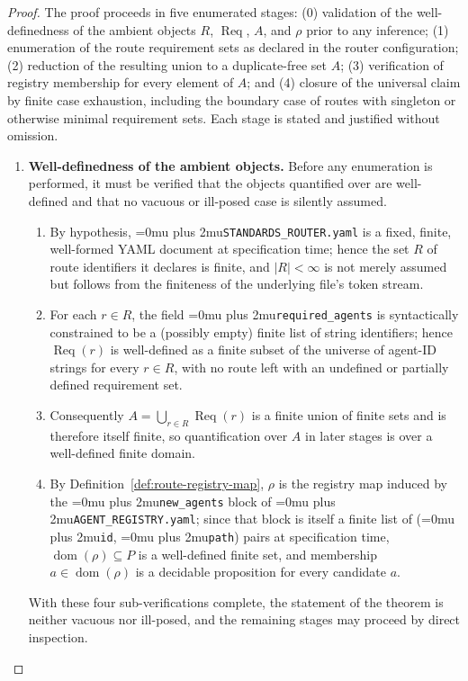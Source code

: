 \documentclass[12pt]{article}
\theoremstyle{definition}
\DeclareRobustCommand{\code}[1]{\begingroup\Urlmuskip=0mu plus 2mu\relax\nolinkurl{#1}\endgroup}
\begin{document}
\begin{proof}
The proof proceeds in five enumerated stages: (0) validation of the
well-definedness of the ambient objects $R$, $\operatorname{Req}$,
$A$, and $\rho$ prior to any inference; (1) enumeration of the route
requirement sets as declared in the router configuration; (2)
reduction of the resulting union to a duplicate-free set $A$; (3)
verification of registry membership for every element of $A$; and
(4) closure of the universal claim by finite case exhaustion,
including the boundary case of routes with singleton or otherwise
minimal requirement sets. Each stage is stated and justified without
omission.

\begin{enumerate}
      \item \textbf{Well-definedness of the ambient objects.} Before
      any enumeration is performed, it must be verified that the
      objects quantified over are well-defined and that no vacuous
      or ill-posed case is silently assumed.
      \begin{enumerate}
            \item[(a)] By hypothesis, \code{STANDARDS\_ROUTER.yaml}
            is a fixed, finite, well-formed YAML document at
            specification time; hence the set $R$ of route
            identifiers it declares is finite, and
            $|R| < \infty$ is not merely assumed but follows from
            the finiteness of the underlying file's token stream.
            \item[(b)] For each $r \in R$, the field
            \code{required\_agents} is syntactically constrained to
            be a (possibly empty) finite list of string identifiers;
            hence $\operatorname{Req}(r)$ is well-defined as a
            finite subset of the universe of agent-ID strings for
            every $r \in R$, with no route left with an undefined or
            partially defined requirement set.
            \item[(c)] Consequently
            $A = \bigcup_{r \in R} \operatorname{Req}(r)$ is a
            finite union of finite sets and is therefore itself
            finite, so quantification over $A$ in later stages is
            over a well-defined finite domain.
            \item[(d)] By Definition~\ref{def:route-registry-map},
            $\rho$ is the registry map induced by the
            \code{new\_agents} block of \code{AGENT\_REGISTRY.yaml};
            since that block is itself a finite list of
            (\code{id}, \code{path}) pairs at specification time,
            $\operatorname{dom}(\rho) \subseteq P$ is a well-defined
            finite set, and membership $a \in \operatorname{dom}(\rho)$
            is a decidable proposition for every candidate $a$.
      \end{enumerate}
      With these four sub-verifications complete, the statement of
      the theorem is neither vacuous nor ill-posed, and the
      remaining stages may proceed by direct inspection.


\end{enumerate}
\end{proof}
\end{document}
